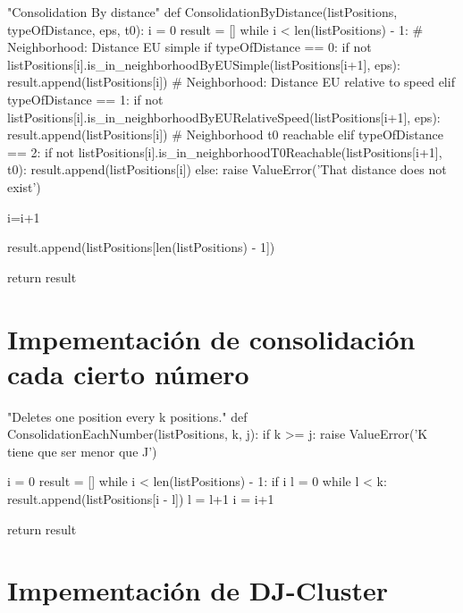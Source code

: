 \documentclass[a4paper, 12pt]{article}
\begin{document}
\begin{python}
"Consolidation By distance"
def ConsolidationByDistance(listPositions, typeOfDistance, eps, t0):
	i = 0
	result = []
	while i < len(listPositions) - 1:
		# Neighborhood: Distance EU simple
		if typeOfDistance == 0:
			if not listPositions[i].is_in_neighborhoodByEUSimple(listPositions[i+1], eps):
				result.append(listPositions[i])
		# Neighborhood: Distance EU relative to speed
		elif typeOfDistance == 1:
			if not listPositions[i].is_in_neighborhoodByEURelativeSpeed(listPositions[i+1], eps):
				result.append(listPositions[i])
		# Neighborhood t0 reachable
		elif typeOfDistance == 2:
			if not listPositions[i].is_in_neighborhoodT0Reachable(listPositions[i+1], t0):
				result.append(listPositions[i])
		else:
			raise ValueError('That distance does not exist')

		i=i+1

	result.append(listPositions[len(listPositions) - 1])

	return result

\end{python}

\newpage
\section{Impementaci\'on de consolidaci\'on cada cierto n\'umero} \label{App:AppendixB}

\begin{python}
"Deletes one position every k positions."
def ConsolidationEachNumber(listPositions, k, j):
	if k >= j:
		raise ValueError('K tiene que ser menor que J')
        
	i = 0
	result = []
	while i < len(listPositions) - 1:
		if i%
			l = 0
			while l < k:
				result.append(listPositions[i - l])
				l = l+1
			i = i+1

	return result
\end{python}


\newpage
\section{Impementaci\'on de DJ-Cluster} \label{App:AppendixC}
\end{document}
